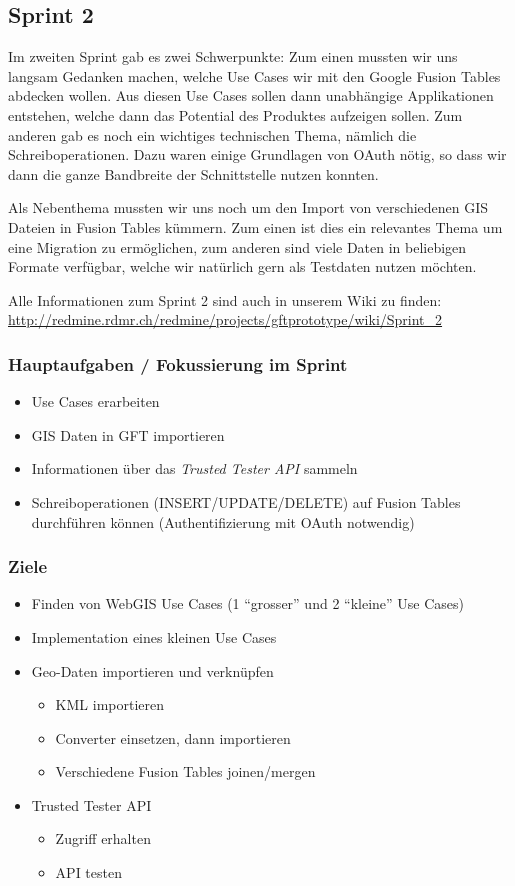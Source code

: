 \subsection{Sprint 2}

Im zweiten Sprint gab es zwei Schwerpunkte: Zum einen mussten wir uns langsam Gedanken machen, welche Use Cases wir mit den Google Fusion Tables abdecken wollen. Aus diesen Use Cases sollen dann unabhängige Applikationen entstehen, welche dann das Potential des Produktes aufzeigen sollen. Zum anderen gab es noch ein wichtiges technischen Thema, nämlich die Schreiboperationen. Dazu waren einige Grundlagen von \gls{OAuth} nötig, so dass wir dann die ganze Bandbreite der Schnittstelle nutzen konnten.

Als Nebenthema mussten wir uns noch um den Import von verschiedenen \gls{GIS} Dateien in Fusion Tables kümmern. Zum einen ist dies ein relevantes Thema um eine Migration zu ermöglichen, zum anderen sind viele Daten in beliebigen Formate verfügbar, welche wir natürlich gern als Testdaten nutzen möchten.

Alle Informationen zum Sprint 2 sind auch in unserem Wiki zu finden:
\url{http://redmine.rdmr.ch/redmine/projects/gftprototype/wiki/Sprint_2}

\subsubsection{Hauptaufgaben / Fokussierung im Sprint}
\begin{itemize}
	\item Use Cases erarbeiten
	\item \gls{GIS} Daten in GFT importieren
	\item Informationen über das \emph{Trusted Tester \gls{API}} sammeln
	\item Schreiboperationen (INSERT/UPDATE/DELETE) auf Fusion Tables durchführen können (Authentifizierung mit \gls{OAuth} notwendig)
\end{itemize}

\subsubsection{Ziele}
\begin{itemize}
	\item Finden von Web\gls{GIS} Use Cases (1 "`grosser"' und 2 "`kleine"' Use Cases)
	\item Implementation eines kleinen Use Cases
	\item Geo-Daten importieren und verknüpfen
	\begin{itemize}
		\item \gls{KML} importieren
		\item Converter einsetzen, dann importieren
		\item Verschiedene Fusion Tables joinen/mergen
	\end{itemize}
	\item Trusted Tester \gls{API}
	\begin{itemize}
		\item Zugriff erhalten
		\item \gls{API} testen
	\end{itemize}
\end{itemize}

